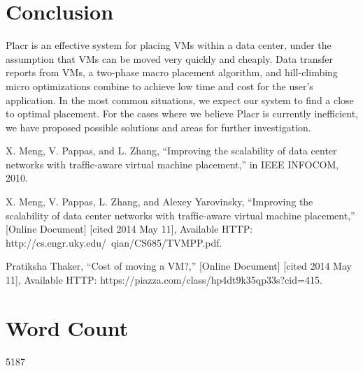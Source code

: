 \documentclass[11pt]{article}
\begin{document}
\section{Conclusion}

Placr is an effective system for placing VMs within a data center, under the assumption that VMs can be moved very quickly and cheaply.  Data transfer reports from VMs, a two-phase macro placement algorithm, and hill-climbing micro optimizations combine to achieve low time and cost for the user's application.  In the most common situations, we expect our system to find a close to optimal placement. For the cases where we believe Placr is currently inefficient, we have proposed possible solutions and areas for further investigation.



\begin{thebibliography}{9}

  X. Meng, V. Pappas, and L. Zhang, ``Improving the scalability of data
center networks with trafﬁc-aware virtual machine placement,'' in IEEE
INFOCOM, 2010.

X. Meng, V. Pappas, L. Zhang, and Alexey Yarovinsky, ``Improving the scalability of data
center networks with trafﬁc-aware virtual machine placement,'' [Online Document] [cited 2014 May 11], Available HTTP: http://cs.engr.uky.edu/~qian/CS685/TVMPP.pdf.

 Pratiksha Thaker, ``Cost of moving a VM?,'' [Online Document] [cited 2014 May 11], Available HTTP: https://piazza.com/class/hp4dt9k35qp33s?cid=415.

\end{thebibliography}

\section*{Word Count}
5187
\end{document}
